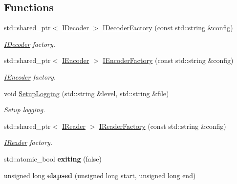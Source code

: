 \subsection*{Functions}
\begin{DoxyCompactItemize}
\item 
std\+::shared\+\_\+ptr$<$ \hyperlink{classmoetsi_1_1ssp_1_1IDecoder}{I\+Decoder} $>$ \hyperlink{namespacemoetsi_1_1ssp_a9478a722eaeec487c7288ed18c9a06bc}{I\+Decoder\+Factory} (const std\+::string \&config)
\begin{DoxyCompactList}\small\item\em \hyperlink{classmoetsi_1_1ssp_1_1IDecoder}{I\+Decoder} factory. \end{DoxyCompactList}\item 
std\+::shared\+\_\+ptr$<$ \hyperlink{classmoetsi_1_1ssp_1_1IEncoder}{I\+Encoder} $>$ \hyperlink{namespacemoetsi_1_1ssp_a7e5e01bac9a0fade08d2b71d1c16bcbe}{I\+Encoder\+Factory} (const std\+::string \&config)
\begin{DoxyCompactList}\small\item\em \hyperlink{classmoetsi_1_1ssp_1_1IEncoder}{I\+Encoder} factory. \end{DoxyCompactList}\item 
void \hyperlink{namespacemoetsi_1_1ssp_a0af356ab87e92f92c49e7118b9cb1ba2}{Setup\+Logging} (std\+::string \&level, std\+::string \&file)
\begin{DoxyCompactList}\small\item\em Setup logging. \end{DoxyCompactList}\item 
std\+::shared\+\_\+ptr$<$ \hyperlink{classmoetsi_1_1ssp_1_1IReader}{I\+Reader} $>$ \hyperlink{namespacemoetsi_1_1ssp_ad5e820c4c6a1a43d5e85608a06b86ea8}{I\+Reader\+Factory} (const std\+::string \&config)
\begin{DoxyCompactList}\small\item\em \hyperlink{classmoetsi_1_1ssp_1_1IReader}{I\+Reader} factory. \end{DoxyCompactList}\item 
\mbox{\label{namespacemoetsi_1_1ssp_a316383e8c51e6cb5f67a013bd0311bb8}} 
std\+::atomic\+\_\+bool {\bfseries exiting} (false)
\item 
\mbox{\label{namespacemoetsi_1_1ssp_a884aae59668e7913051f2875b047688e}} 
unsigned long {\bfseries elapsed} (unsigned long start, unsigned long end)

\end{DoxyCompactItemize}
